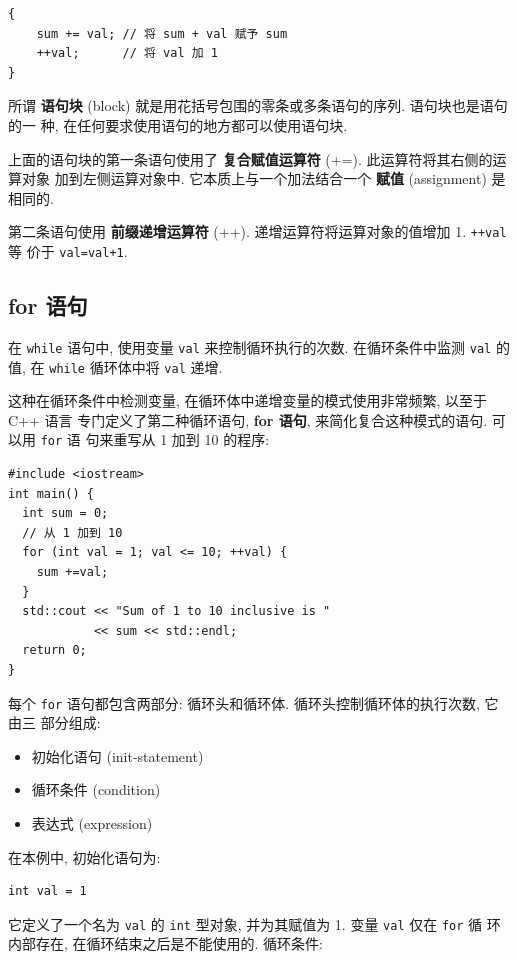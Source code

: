 \documentclass[lang=cn]{elegantbook}
\begin{document}
\begin{verbatim}
{
    sum += val; // 将 sum + val 赋予 sum
    ++val;      // 将 val 加 1
}
\end{verbatim}

所谓 \textbf{语句块} (block) 就是用花括号包围的零条或多条语句的序列. 语句块也是语句的一
种, 在任何要求使用语句的地方都可以使用语句块.

上面的语句块的第一条语句使用了 \textbf{复合赋值运算符} (+=). 此运算符将其右侧的运算对象
加到左侧运算对象中. 它本质上与一个加法结合一个 \textbf{赋值} (assignment) 是相同的.

第二条语句使用 \textbf{前缀递增运算符} (++). 递增运算符将运算对象的值增加 1. \texttt{++val} 等
价于 \texttt{val=val+1}.

\subsection{for 语句}
\label{sec:orge2d2ae3}

在 \texttt{while} 语句中, 使用变量 \texttt{val} 来控制循环执行的次数. 在循环条件中监测 \texttt{val} 的
值, 在 \texttt{while} 循环体中将 \texttt{val} 递增.

这种在循环条件中检测变量, 在循环体中递增变量的模式使用非常频繁, 以至于 C++ 语言
专门定义了第二种循环语句, \textbf{for 语句}, 来简化复合这种模式的语句. 可以用 \texttt{for} 语
句来重写从 1 加到 10 的程序:

\begin{verbatim}
#include <iostream>
int main() {
  int sum = 0;
  // 从 1 加到 10
  for (int val = 1; val <= 10; ++val) {
    sum +=val;
  }
  std::cout << "Sum of 1 to 10 inclusive is "
            << sum << std::endl;
  return 0;
}
\end{verbatim}

每个 \texttt{for} 语句都包含两部分: 循环头和循环体. 循环头控制循环体的执行次数, 它由三
部分组成:

\begin{itemize}
\item 初始化语句 (init-statement)
\item 循环条件 (condition)
\item 表达式 (expression)
\end{itemize}

在本例中, 初始化语句为:

\begin{verbatim}
int val = 1
\end{verbatim}

它定义了一个名为 \texttt{val} 的 \texttt{int} 型对象, 并为其赋值为 1. 变量 \texttt{val} 仅在 \texttt{for} 循
环内部存在, 在循环结束之后是不能使用的. 循环条件:
\end{document}
